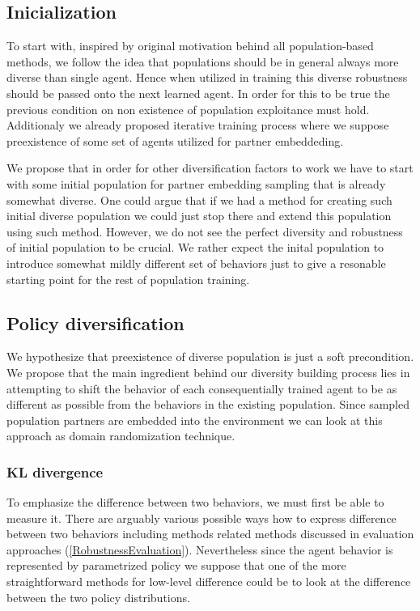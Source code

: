 \subsection{Inicialization}
To start with, inspired by original motivation behind all population-based methods, we follow the idea that populations should be in general always more diverse than single agent.
Hence when utilized in training this diverse robustness should be passed onto the next learned agent.
In order for this to be true the previous condition on non existence of population exploitance must hold.
Additionaly we already proposed iterative training process where we suppose preexistence of some set of agents utilized for partner embeddeding.

We propose that in order for other diversification factors to work we have to start with some initial population for partner embedding sampling that is already somewhat diverse.
One could argue that if we had a method for creating such initial diverse population we could just stop there and extend this population using such method.
However, we do not see the perfect diversity and robustness of initial population to be crucial. 
We rather expect the inital population to introduce somewhat mildly different set of behaviors just to give a resonable starting point for the rest of population training.

\subsection{Policy diversification}
We hypothesize that preexistence of diverse population is just a soft precondition.
We propose that the main ingredient behind our diversity building process lies in attempting to shift the behavior of each consequentially trained agent to be as different as possible from the behaviors in the existing population.
Since sampled population partners are embedded into the environment we can look at this approach as domain randomization technique.

\subsubsection{KL divergence}
To emphasize the difference between two behaviors, we must first be able to measure it.
There are arguably various possible ways how to express difference between two behaviors including methods related methods discussed in evaluation approaches (\ref{RobustnessEvaluation}).
Nevertheless since the agent behavior is represented by parametrized policy we suppose that one of the more straightforward methods for low-level difference could be to look at the difference between the two policy distributions.

